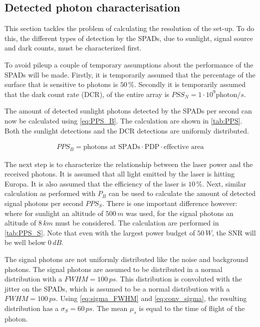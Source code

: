 \subsection{Detected photon characterisation} 
\label{ssec:detected_count_characterisation}
This section tackles the problem of calculating the resolution of the set-up. To do this, the different types of detection by the SPADs, due to sunlight, signal source and dark counts, must be characterized first.

To avoid pileup a couple of temporary assumptions about the performance of the SPADs will be made. Firstly, it is temporarily assumed that the percentage of the surface that is sensitive to photons is $50\,\%$. Secondly it is temporarily assumed that the dark count rate (DCR), of the entire array is $PSS_N=1\cdot10^9 \text{photon}/s$.

The amount of detected sunlight photons detected by the SPADs per second can now be calculated using \cref{eq:PPS_B}. The calculation are shown in \cref{tab:PPS}. Both the sunlight detections and the DCR detections are uniformly distributed.

\begin{align}\label{eq:PPS_B}
PPS_B = \text{photons at SPADs}\cdot \text{PDP} \cdot \text{effective area}
\end{align}



The next step is to characterize the relationship between the laser power and the received photons. It is assumed that all light emitted by the laser is hitting Europa. It is also assumed that the efficiency of the laser is $10\,\%$. Next, similar calculation as performed with $P_B$ can be used to calculate the amount of detected signal photons per second $PPS_S$. There is one important difference however: where for sunlight an altitude of $500\,m$ was used, for the signal photons an altitude of $8\,km$ must be considered. The calculation are performed in \cref{tab:PPS_S}. Note that even with the largest power budget of $50\,W$, the SNR will be well below $0\,dB$.



The signal photons are not uniformly distributed like the noise and background photons. The signal photons are assumed to be distributed in a normal distribution with a $FWHM=100\,ps$. This distribution is convoluted with the jitter on the SPADs, which is assumed to be a normal distribution with a  $FWHM=100\,ps$. Using \cref{eq:sigma_FWHM} and \cref{eq:conv_sigma}, the resulting distribution has a $\sigma_S=60\,ps$. The mean $\mu_s$ is equal to the time of flight of the photon.

